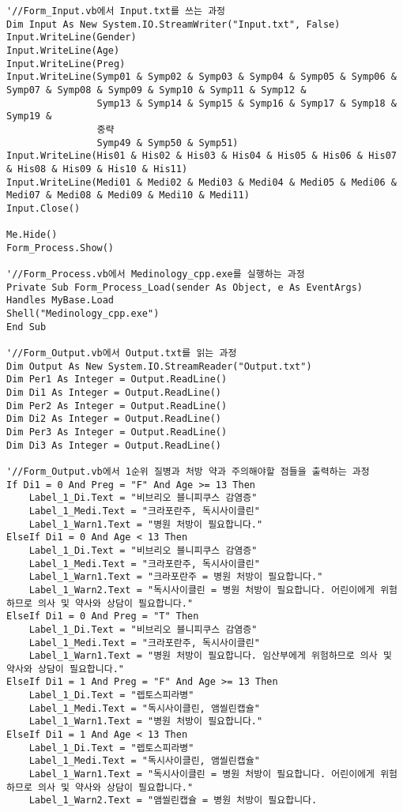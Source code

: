 \documentclass{report}
\begin{document}
\begin{lstlisting}
'//Form_Input.vb에서 Input.txt를 쓰는 과정
Dim Input As New System.IO.StreamWriter("Input.txt", False)
Input.WriteLine(Gender)
Input.WriteLine(Age)
Input.WriteLine(Preg)
Input.WriteLine(Symp01 & Symp02 & Symp03 & Symp04 & Symp05 & Symp06 & Symp07 & Symp08 & Symp09 & Symp10 & Symp11 & Symp12 &
                Symp13 & Symp14 & Symp15 & Symp16 & Symp17 & Symp18 & Symp19 & 
                중략
                Symp49 & Symp50 & Symp51)
Input.WriteLine(His01 & His02 & His03 & His04 & His05 & His06 & His07 & His08 & His09 & His10 & His11)
Input.WriteLine(Medi01 & Medi02 & Medi03 & Medi04 & Medi05 & Medi06 & Medi07 & Medi08 & Medi09 & Medi10 & Medi11)
Input.Close()

Me.Hide()
Form_Process.Show()

'//Form_Process.vb에서 Medinology_cpp.exe를 실행하는 과정
Private Sub Form_Process_Load(sender As Object, e As EventArgs) Handles MyBase.Load
Shell("Medinology_cpp.exe")
End Sub

'//Form_Output.vb에서 Output.txt를 읽는 과정
Dim Output As New System.IO.StreamReader("Output.txt")
Dim Per1 As Integer = Output.ReadLine()
Dim Di1 As Integer = Output.ReadLine()
Dim Per2 As Integer = Output.ReadLine()
Dim Di2 As Integer = Output.ReadLine()
Dim Per3 As Integer = Output.ReadLine()
Dim Di3 As Integer = Output.ReadLine()

'//Form_Output.vb에서 1순위 질병과 처방 약과 주의해야할 점들을 출력하는 과정
If Di1 = 0 And Preg = "F" And Age >= 13 Then
    Label_1_Di.Text = "비브리오 블니피쿠스 감염증"
    Label_1_Medi.Text = "크라포란주, 독시사이클린"
    Label_1_Warn1.Text = "병원 처방이 필요합니다."
ElseIf Di1 = 0 And Age < 13 Then
    Label_1_Di.Text = "비브리오 블니피쿠스 감염증"
    Label_1_Medi.Text = "크라포란주, 독시사이클린"
    Label_1_Warn1.Text = "크라포란주 = 병원 처방이 필요합니다."
    Label_1_Warn2.Text = "독시사이클린 = 병원 처방이 필요합니다. 어린이에게 위험하므로 의사 및 약사와 상담이 필요합니다."
ElseIf Di1 = 0 And Preg = "T" Then
    Label_1_Di.Text = "비브리오 블니피쿠스 감염증"
    Label_1_Medi.Text = "크라포란주, 독시사이클린"
    Label_1_Warn1.Text = "병원 처방이 필요합니다. 임산부에게 위험하므로 의사 및 약사와 상담이 필요합니다."
ElseIf Di1 = 1 And Preg = "F" And Age >= 13 Then
    Label_1_Di.Text = "렙토스피라병"
    Label_1_Medi.Text = "독시사이클린, 앰씰린캡슐"
    Label_1_Warn1.Text = "병원 처방이 필요합니다."
ElseIf Di1 = 1 And Age < 13 Then
    Label_1_Di.Text = "렙토스피라병"
    Label_1_Medi.Text = "독시사이클린, 앰씰린캡슐"
    Label_1_Warn1.Text = "독시사이클린 = 병원 처방이 필요합니다. 어린이에게 위험하므로 의사 및 약사와 상담이 필요합니다."
    Label_1_Warn2.Text = "앰씰린캡슐 = 병원 처방이 필요합니다.

\end{lstlisting}
\end{document}
